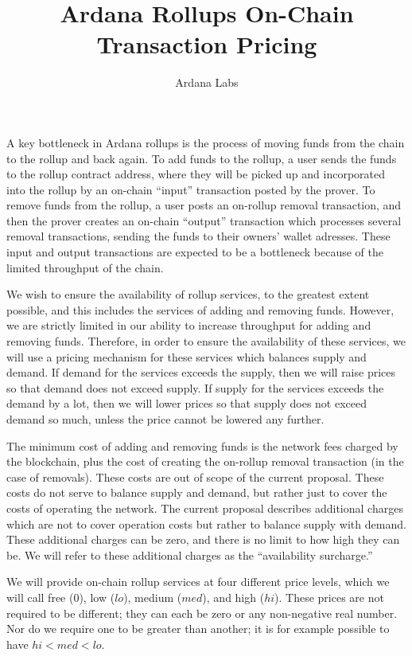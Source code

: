 \documentclass[12pt]{article}
\title{Ardana Rollups On-Chain Transaction Pricing}
\author{Ardana Labs}
\begin{document}
\maketitle


A key bottleneck in Ardana rollups is the process of moving funds from the chain to the rollup and back again. To add funds to the rollup, a user sends the funds to the rollup contract address, where they will be picked up and incorporated into the rollup by an on-chain ``input'' transaction posted by the prover. To remove funds from the rollup, a user posts an on-rollup removal transaction, and then the prover creates an on-chain ``output'' transaction which processes several removal transactions, sending the funds to their owners' wallet adresses. These input and output transactions are expected to be a bottleneck because of the limited throughput of the chain. 

We wish to ensure the availability of rollup services, to the greatest extent possible, and this includes the services of adding and removing funds. However, we are strictly limited in our ability to increase throughput for adding and removing funds. Therefore, in order to ensure the availability of these services, we will use a pricing mechanism for these services which balances supply and demand. If demand for the services exceeds the supply, then we will raise prices so that demand does not exceed supply. If supply for the services exceeds the demand by a lot, then we will lower prices so that supply does not exceed demand so much, unless the price cannot be lowered any further.

The minimum cost of adding and removing funds is the network fees charged by the blockchain, plus the cost of creating the on-rollup removal transaction (in the case of removals). These costs are out of scope of the current proposal. These costs do not serve to balance supply and demand, but rather just to cover the costs of operating the network. The current proposal describes additional charges which are not to cover operation costs but rather to balance supply with demand. These additional charges can be zero, and there is no limit to how high they can be. We will refer to these additional charges as the ``availability surcharge.''

We will provide on-chain rollup services at four different price levels, which we will call free ($0$), low ($lo$), medium ($med$), and high ($hi$). These prices are not required to be different; they can each be zero or any non-negative real number. Nor do we require one to be greater than another; it is for example possible to have $hi < med < lo$.
\end{document}
